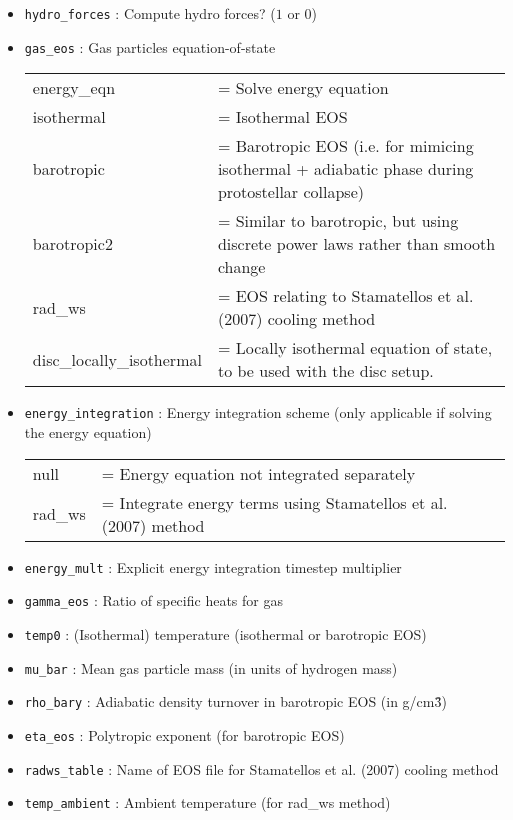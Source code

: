 \documentclass[a4paper]{article}
\newcommand{\var}[1]{\texttt{#1}}
\begin{document}
\begin{itemize}
\item \var{hydro\_forces} : Compute hydro forces?  ($1$ or $0$)

\item \var{gas\_eos} : Gas particles equation-of-state \\
\begin{tabular}{ll}
energy\_eqn & = Solve energy equation \\
isothermal  & = Isothermal EOS \\
barotropic  & = Barotropic EOS (i.e. for mimicing isothermal + adiabatic phase during protostellar collapse) \\
barotropic2  & = Similar to barotropic, but using discrete power laws rather than smooth change \\
rad\_ws     & = EOS relating to Stamatellos et al. (2007) cooling method \\
disc\_locally\_isothermal & = Locally isothermal equation of state, to be used with the disc setup.
\end{tabular}


\item \var{energy\_integration} : Energy integration scheme (only applicable if solving the energy equation) \\
\begin{tabular}{ll}
null        & = Energy equation not integrated separately \\
rad\_ws     & = Integrate energy terms using Stamatellos et al. (2007) method
\end{tabular}

\item \var{energy\_mult} : Explicit energy integration timestep multiplier

\item \var{gamma\_eos} : Ratio of specific heats for gas

\item \var{temp0} : (Isothermal) temperature (isothermal or barotropic EOS)

\item \var{mu\_bar}    : Mean gas particle mass (in units of hydrogen mass)

\item \var{rho\_bary} : Adiabatic density turnover in barotropic EOS (in g/cm\^3)

\item \var{eta\_eos}   : Polytropic exponent (for barotropic EOS)

\item \var{radws\_table} : Name of EOS file for Stamatellos et al. (2007) cooling method

\item \var{temp\_ambient} : Ambient temperature (for rad\_ws method)




\end{itemize}
\end{document}
